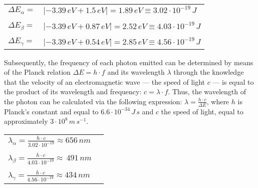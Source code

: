 \begin{table}[h!]
	\centering
	\begin{tabular}{l l}
		$\Delta E_{\alpha} = $ & $|-3.39\, eV + 1.5\, eV| = 1.89\, eV \equiv 3.02 \cdot 10^{-19}\, J$
		\\ & \\
		$\Delta E_{\beta} = $ & $ |-3.39\, eV + 0.87\, eV| = 2.52\, eV \equiv 4.03 \cdot 10^{-19}\, J$
		\\ & \\
		$\Delta E_{\gamma} = $ & $ |-3.39\, eV + 0.54\, eV| = 2.85\, eV \equiv 4.56 \cdot 10^{-19}\, J$
	\end{tabular}
\end{table}

\pagebreak

Subsequently, the frequency of each photon emitted can be determined by means of the Planck relation $\Delta E = h \cdot f$ and its wavelength $\lambda$ through the knowledge that the velocity of an electromagnetic wave --- the speed of light $c$ --- is equal to the product of its wavelength and frequency: $c = \lambda \cdot f$. Thus, the wavelength of the photon can be calculated via the following expression: $\lambda = \frac{h \cdot c}{\Delta E}$, where $h$ is Planck's constant and equal to $6.6 \cdot 10^{-34}\, J\, s$ and $c$ the speed of light, equal to approximately $3 \cdot 10^8\, m\, s^{-1}$.

\begin{table}[h!]
	\centering
	\begin{tabular}{l l}
		$\lambda_\alpha = \frac{h \cdot c}{3.02 \cdot 10^{-19}} \approx 656 \, nm$
		\\ & \\
		$\lambda_\beta = \frac{h \cdot c}{4.03 \cdot 10^{-19}} \approx  \, 491\, nm$
		\\ & \\
		$\lambda_\gamma = \frac{h \cdot c}{4.56 \cdot 10^{-19}} \approx 434 \, nm$
	\end{tabular}
\end{table}

